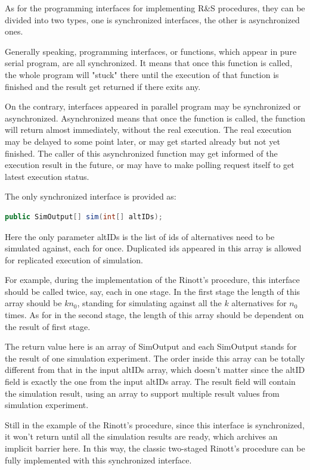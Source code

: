 \documentclass[12pt,a4]{report}
\begin{document}
As for the programming interfaces for implementing R\&S procedures, they can be divided into two types, one is synchronized interfaces, the other is asynchronized ones.

Generally speaking, programming interfaces, or functions, which appear in pure serial program, are all synchronized. It means that once this function is called, the whole program will "stuck" there until the execution of that function is finished and the result get returned if there exits any.

On the contrary, interfaces appeared in parallel program may be synchronized or asynchronized. Asynchronized means that once the function is called, the function will return almost immediately, without the real execution. The real execution may be delayed to some point later, or may get started already but not yet finished. The caller of this asynchronized function may get informed of the execution result in the future, or may have to make polling request itself to get latest execution status.

The only synchronized interface is provided as:

\begin{lstlisting}[language=Java]
public SimOutput[] sim(int[] altIDs);
\end{lstlisting}

Here the only parameter altIDs is the list of ids of alternatives need to be simulated against, each for once. Duplicated ids appeared in this array is allowed for replicated execution of simulation.

For example, during the implementation of the Rinott's procedure, this interface should be called twice, say, each in one stage. In the first stage the length of this array should be $kn_0$, standing for simulating against all the $k$ alternatives for $n_0$ times. As for in the second stage, the length of this array should be dependent on the result of first stage.

The return value here is an array of SimOutput and each SimOutput stands for the result of one simulation experiment. The order inside this array can be totally different from that in the input altIDs array, which doesn't matter since the altID field is exactly the one from the input altIDs array. The result field will contain the simulation result, using an array to support multiple result values from simulation experiment.

Still in the example of the Rinott's procedure, since this interface is synchronized, it won't return until all the simulation results are ready, which archives an implicit barrier here. In this way, the classic two-staged Rinott's procedure can be fully implemented with this synchronized interface.
\end{document}
